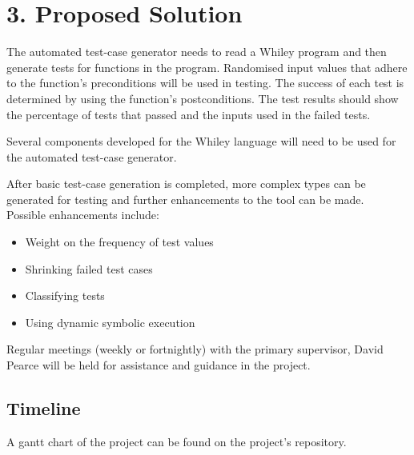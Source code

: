 \documentclass[11pt, a4paper, twoside, openright]{report}
\begin{document}
\section*{3. Proposed Solution}

The automated test-case generator needs to read a Whiley program and then generate tests for functions in the program. 
Randomised input values that adhere to the function's preconditions will be used in testing. 
The success of each test is determined by using the function's postconditions. 
The test results should show the percentage of tests that passed and the inputs used in the failed tests.

Several components developed for the Whiley language will need to be used for the automated test-case generator. 

After basic test-case generation is completed, more complex types can be generated for testing and further enhancements to the tool can be made. \\

Possible enhancements include:
\begin{itemize}
	\item Weight on the frequency of test values
	\item Shrinking failed test cases
	\item Classifying tests
	\item Using dynamic symbolic execution
\end{itemize} 

Regular meetings (weekly or fortnightly) with the primary supervisor, David Pearce will be held for assistance and guidance in the project.

\subsection*{Timeline}
A gantt chart of the project can be found on the project's repository.
\end{document}
